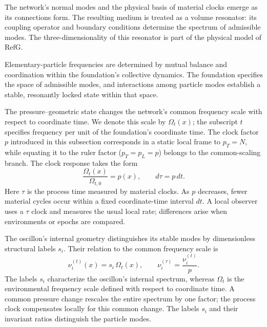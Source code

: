 \documentclass[11pt,a4paper]{article}
\newcommand{\RefG}{\mathrm{RefG}}
\begin{document}
The network's normal modes and the physical basis of material clocks emerge as its connections form. The resulting medium is treated as a volume resonator: its coupling operator and boundary conditions determine the spectrum of admissible modes. The three-dimensionality of this resonator is part of the physical model of $\RefG$.

Elementary-particle frequencies are determined by mutual balance and coordination within the foundation's collective dynamics. The foundation specifies the space of admissible modes, and interactions among particle modes establish a stable, resonantly locked state within that space.

The pressure--geometric state changes the network's common frequency scale with respect to coordinate time. We denote this scale by $\Omega_t(x)$; the subscript $t$ specifies frequency per unit of the foundation's coordinate time. The clock factor $p$ introduced in this subsection corresponds in a static local frame to $p_T=N$, while equating it to the ruler factor ($p_T = p_L = p$) belongs to the common-scaling branch. The clock response takes the form
\begin{equation}
\frac{\Omega_t(x)}{\Omega_{t,0}}=p(x),
\qquad
d\tau=p\,dt.
\end{equation}
Here $\tau$ is the process time measured by material clocks. As $p$ decreases, fewer material cycles occur within a fixed coordinate-time interval $dt$. A local observer uses a $\tau$ clock and measures the usual local rate; differences arise when environments or epochs are compared.

The oscillon's internal geometry distinguishes its stable modes by dimensionless structural labels $s_i$. Their relation to the common frequency scale is
\begin{equation}
\nu_i^{(t)}(x)=s_i\,\Omega_t(x),
\qquad
\nu_i^{(\tau)}=\frac{\nu_i^{(t)}}{p}.
\end{equation}
The labels $s_i$ characterize the oscillon's internal spectrum, whereas $\Omega_t$ is the environmental frequency scale defined with respect to coordinate time. A common pressure change rescales the entire spectrum by one factor; the process clock compensates locally for this common change. The labels $s_i$ and their invariant ratios distinguish the particle modes.
\end{document}
